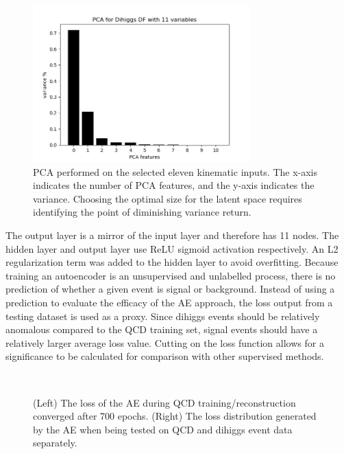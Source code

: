 \begin{figure}[!h] 
\begin{center}
\includegraphics*[width=0.75\textwidth] {AE/figures/ae_PCA_11vars}
\caption{PCA performed on the selected eleven kinematic inputs. The x-axis indicates the number of PCA features, and the y-axis indicates the variance. Choosing the optimal size for the latent space requires identifying the point of diminishing variance return.}
  \label{fig:ae_pca}
\end{center}
\end{figure}

The output layer is a mirror of the input layer and therefore has 11 nodes. The hidden layer and output layer use ReLU sigmoid activation respectively. An L2 regularization term was added to the hidden layer to avoid overfitting. %
Because training an autoencoder is an unsupervised and unlabelled process, there is no prediction of whether a given event is signal or background. Instead of using a prediction to evaluate the efficacy of the AE approach, the loss output from a testing dataset is used as a proxy. Since dihiggs events should be relatively anomalous compared to the QCD training set, signal events should have a relatively larger average loss value. Cutting on the loss function allows for a significance to be calculated for comparison with other supervised methods.

\begin{figure}[!h] 
  \begin{center}
    \\
    \caption{(Left) The loss of the AE during QCD training/reconstruction converged after 700 epochs. (Right) The loss distribution generated by the AE when being tested on QCD and dihiggs event data separately.}    
  \label{fig:ae_trainPredLoss}
\end{center}
\end{figure}

